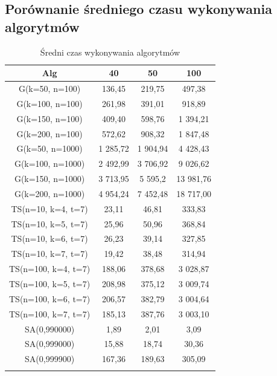 \documentclass[wide,a4paper,titlepage,12pt] {article}
\begin{document}
\subsection{Porównanie średniego czasu wykonywania algorytmów}
\begin{center}
    \begin{longtable}{|c|c|c|c|}
        \hline
        Alg & 40 & 50 & 100 \\ \hline
        G(k=50, n=100) & 136,45 & 219,75 & 497,38\\ \hline
        G(k=100, n=100)& 261,98 & 391,01 & 918,89\\ \hline
        G(k=150, n=100)& 409,40 &  598,76 & 1 394,21\\ \hline
        G(k=200, n=100)& 572,62 & 908,32 & 1 847,48\\ \hline
        G(k=50, n=1000)& 1 285,72& 1 904,94& 4 428,43\\ \hline
        G(k=100, n=1000)  &  2 492,99 &3 706,92& 9 026,62\\ \hline
        G(k=150, n=1000)   & 3 713,95 &5 595,2  &13 981,76\\ \hline
        G(k=200, n=1000)   & 4 954,24& 7 452,48& 18 717,00\\ \hline
        TS(n=10, k=4, t=7) & 23,11 &  46,81 &  333,83\\ \hline
        TS(n=10, k=5, t=7) & 25,96 &  50,96 &  368,84\\ \hline
        TS(n=10, k=6, t=7) & 26,23 &  39,14 &  327,85\\ \hline
        TS(n=10, k=7, t=7) & 19,42  & 38,48  & 314,94\\ \hline
        TS(n=100, k=4, t=7)& 188,06 & 378,68 & 3 028,87\\ \hline
        TS(n=100, k=5, t=7)& 208,98 & 375,12 & 3 009,74\\ \hline
        TS(n=100, k=6, t=7)& 206,57 & 382,79 & 3 004,64\\ \hline
        TS(n=100, k=7, t=7) &185,13  &387,76 & 3 003,10\\ \hline
        SA(0,990000)  &  1,89  &  2,01 &   3,09\\ \hline
        SA(0,999000)  &  15,88 &  18,74 &  30,36\\ \hline
        SA(0,999900)  &  167,36 & 189,63 & 305,09\\ \hline
        \caption{Średni czas wykonywania algorytmów}
    \end{longtable}
\end{center}
\end{document}

